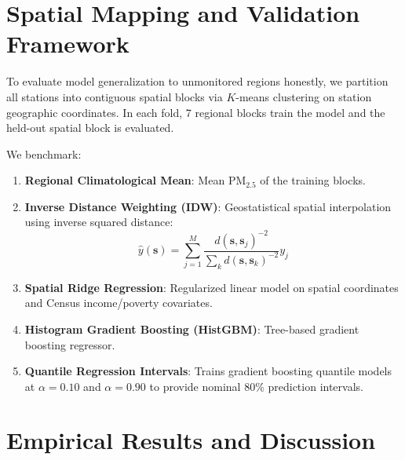 \documentclass[conference]{IEEEtran}
\begin{document}
\section{Spatial Mapping and Validation Framework}
To evaluate model generalization to unmonitored regions honestly, we partition all \numStations{} stations into \numClusters{} contiguous spatial blocks via $K$-means clustering on station geographic coordinates. In each fold, 7 regional blocks train the model and the held-out spatial block is evaluated.

We benchmark:
\begin{enumerate}
    \item \textbf{Regional Climatological Mean}: Mean $\mathrm{PM}_{2.5}$ of the training blocks.
    \item \textbf{Inverse Distance Weighting (IDW)}: Geostatistical spatial interpolation using inverse squared distance:
    \begin{equation}
    \hat{y}(\mathbf{s}) = \sum_{j=1}^M \frac{d(\mathbf{s}, \mathbf{s}_j)^{-2}}{\sum_{k} d(\mathbf{s}, \mathbf{s}_k)^{-2}} y_j
    \end{equation}
    \item \textbf{Spatial Ridge Regression}: Regularized linear model on spatial coordinates and Census income/poverty covariates.
    \item \textbf{Histogram Gradient Boosting (HistGBM)}: Tree-based gradient boosting regressor.
    \item \textbf{Quantile Regression Intervals}: Trains gradient boosting quantile models at $\alpha = 0.10$ and $\alpha = 0.90$ to provide nominal 80\% prediction intervals.
\end{enumerate}

\section{Empirical Results and Discussion}


\end{document}
